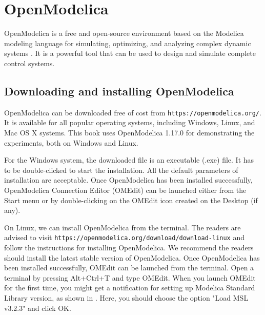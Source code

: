 \begin{juliacode}
      \label{julia:test-firmware}
      
\end{juliacode}






\section{OpenModelica}
\label{sec:OpenModelica-start}
OpenModelica is a free and open-source environment based on the Modelica modeling language 
for simulating, optimizing, and analyzing complex dynamic systems \cite{om-ref}.
It is a powerful tool that can be used to design and simulate complete control systems. 


\subsection{Downloading and installing OpenModelica} \label{OpenModelica-installation}
OpenModelica can be downloaded free of cost from {\tt https://openmodelica.org/}. 
It is available for all popular operating systems, including Windows, Linux, 
and Mac OS X systems. This book uses OpenModelica 1.17.0 for demonstrating the experiments, both on
Windows and Linux.

For the Windows system, the downloaded file is an executable (.exe) file. It has to
be double-clicked to start the installation. All the default parameters of installation
are acceptable. Once OpenModelica has been installed successfully, OpenModelica 
Connection Editor (OMEdit) can be launched either from the Start menu or by double-clicking on the OMEdit icon created on the Desktop (if any).

On Linux, we can install OpenModelica from the terminal. The readers are advised to visit 
{\tt https://openmodelica.org/download/download-linux} and follow the instructions for installing OpenModelica.
We recommend the readers should install the latest stable version of OpenModelica. 
Once OpenModelica has been installed successfully, OMEdit can be launched
from the terminal. Open a terminal by pressing Alt+Ctrl+T and type OMEdit. When you 
launch OMEdit for the first time, you might get a notification for setting up 
Modelica Standard Library version, as shown in . Here, you 
should choose the option "Load MSL v3.2.3" and click OK.  

